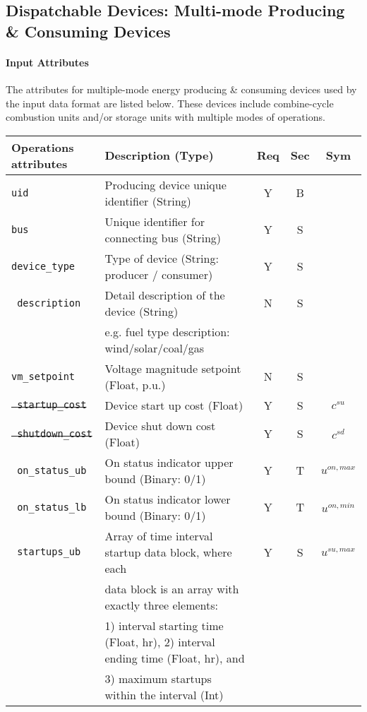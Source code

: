 \documentclass{article}
\begin{document}
\subsection{Dispatchable Devices: Multi-mode Producing \& Consuming Devices}
\label{nom:gen_multi}
\paragraph{Input Attributes} The attributes for
multiple-mode energy producing \& consuming devices used by the input data format are listed below.
These devices include combine-cycle combustion units and/or storage units with multiple modes of operations.

\begin{center}
\small
\begin{tabular}{ l | l | c | c | c |}
Operations attributes & Description (Type) & Req & Sec & Sym\\
\hline
  {\tt uid} & Producing device unique identifier (String) & Y & B &  \\
  {\tt bus} & Unique identifier for connecting bus (String)& Y & S & \\
  {\tt device\_type} & Type of device (String: producer / consumer) & Y & S & \\
  {\tt\color{red} description} & Detail description of the device  (String) & N & S & \\
      &e.g. fuel type description: wind/solar/coal/gas  &  &  & \\
  {\tt vm\_setpoint} & Voltage magnitude setpoint (Float, p.u.) & N & S & \\
  \sout{\tt\color{blue} startup\_cost} & Device start up cost (Float) & Y & S & $c^{su}$\\
  \sout{\tt\color{blue} shutdown\_cost} & Device shut down cost (Float) & Y & S & $c^{sd}$\\
  {\tt\color{blue} on\_status\_ub} & On status indicator upper bound (Binary: 0/1) & Y & T & $u^{on,max}$\\
  {\tt\color{blue} on\_status\_lb} & On status indicator lower bound (Binary: 0/1) & Y & T & $u^{on,min}$\\
  {\tt\color{red} startups\_ub} & {\color{red} Array of time interval startup data block, where each} & Y & S & $u^{su,max}$\\
                                & {\color{red} data block is an array with exactly three elements:} &   &   & \\
                                & {\color{red} 1) interval starting time (Float, hr), 2) interval ending time (Float, hr), and } &   &   & \\
                                & {\color{red} 3) maximum startups within the interval (Int) } &   &   & \\
  

\end{tabular}
\end{center}
\end{document}
